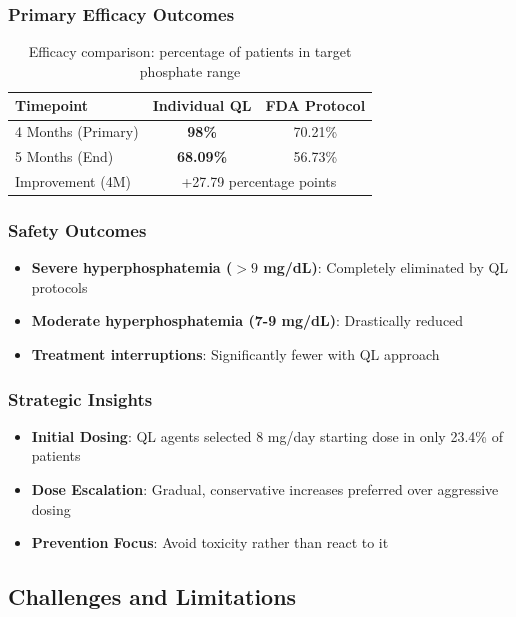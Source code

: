 \subsubsection{Primary Efficacy Outcomes}
\begin{table}[ht]
\centering
\begin{tabular}{lcc}
\hline
Timepoint & Individual QL & FDA Protocol \\
\hline
4 Months (Primary) & \textbf{98\%} & 70.21\% \\
5 Months (End) & \textbf{68.09\%} & 56.73\% \\
Improvement (4M) & \multicolumn{2}{c}{+27.79 percentage points} \\
\hline
\end{tabular}
\caption{Efficacy comparison: percentage of patients in target phosphate range}
\end{table}

\subsubsection{Safety Outcomes}
\begin{itemize}
    \item \textbf{Severe hyperphosphatemia ($> 9$ mg/dL)}: Completely eliminated by QL protocols
    \item \textbf{Moderate hyperphosphatemia (7-9 mg/dL)}: Drastically reduced
    \item \textbf{Treatment interruptions}: Significantly fewer with QL approach
\end{itemize}

\subsubsection{Strategic Insights}
\begin{itemize}
    \item \textbf{Initial Dosing}: QL agents selected 8 mg/day starting dose in only 23.4\% of patients
    \item \textbf{Dose Escalation}: Gradual, conservative increases preferred over aggressive dosing
    \item \textbf{Prevention Focus}: Avoid toxicity rather than react to it
\end{itemize}

\subsection{Challenges and Limitations}

